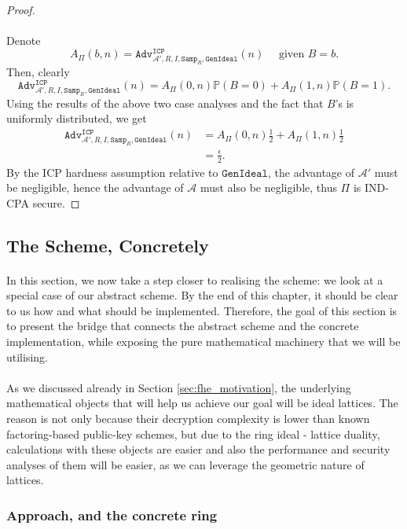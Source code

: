 \documentclass{article}
\theoremstyle{definition}
\theoremstyle{example}
\newcommand{\A}{\mathcal{A}}
\newcommand{\Prob}{\mathbb{P}}
\newcommand{\Adv}[2]{\texttt{Adv}^{\texttt{#1}}_{#2}}
\newcommand{\GenIdeal}{\texttt{GenIdeal}}
\newcommand{\Samp}{\texttt{Samp}}
\begin{document}
\begin{proof}
  \paragraph{} Denote
  \[
    A_\Pi(b, n) = \Adv{ICP}{\A', R, I, \Samp_R, \GenIdeal}(n) \quad \text{ given
    } B = b.
  \]
  Then, clearly
  \[
    \Adv{ICP}{\A', R, I, \Samp_R, \GenIdeal}(n) = A_\Pi(0, n)\Prob(B = 0) +
    A_\Pi(1, n)\Prob(B = 1).
  \]
  Using the results of the above two case analyses and the fact that $B$'s is
  uniformly distributed, we get 
  \begin{align*}
    \Adv{ICP}{\A', R, I, \Samp_R, \GenIdeal}(n) &= A_\Pi(0, n)\frac12 +
    A_\Pi(1, n)\frac12 \\
                                                &= \frac{\epsilon}2.
  \end{align*}
  By the ICP hardness assumption relative to $\GenIdeal$, the advantage of $\A'$
  must be negligible, hence the advantage of $\A$ must also be negligible, thus
  $\Pi$ is IND-CPA secure.
\end{proof}
\subsection{The Scheme, Concretely}
\paragraph{} In this section, we now take a step closer to realising the scheme:
we look at a special case of our abstract scheme. By the end of this chapter, it
should be clear to us how and what should be implemented. Therefore, the goal of
this section is to present the bridge that connects the abstract scheme and the
concrete implementation, while exposing the pure mathematical machinery that
we will be utilising.
\paragraph{}
As we discussed already in Section \ref{sec:fhe_motivation}, the underlying
mathematical objects that will help us achieve our goal will be ideal lattices.
The reason is not only because their decryption complexity is lower than known
factoring-based public-key schemes, but due to the ring ideal - lattice duality,
calculations with these objects are easier and also the performance and security
analyses of them will be easier, as we can leverage the geometric nature of
lattices. 
\subsubsection{Approach, and the concrete ring}
\end{document}
